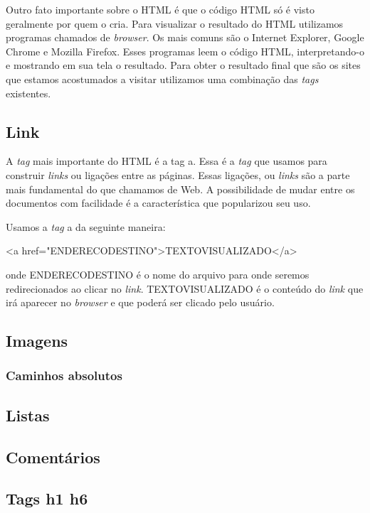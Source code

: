 Outro fato importante sobre o HTML é que o código HTML só é visto geralmente por quem o cria. Para visualizar o resultado do HTML utilizamos programas chamados de \textit{browser}. Os mais comuns são o Internet Explorer, Google Chrome e Mozilla Firefox. Esses programas leem o código HTML, interpretando-o e mostrando em sua tela o resultado. Para obter o resultado final que são os sites que estamos acostumados a visitar utilizamos uma combinação das \textit{tags} existentes.

\subsection{Link}

A \textit{tag} mais importante do HTML é a tag a. Essa é a \textit{tag} que usamos para construir \textit{links} ou ligações entre as páginas. Essas ligações, ou \textit{links} são a parte mais fundamental do que chamamos de Web. A possibilidade de mudar entre os documentos com facilidade é a característica que popularizou seu uso.

Usamos a \textit{tag} a da seguinte maneira:

<a href="ENDERECODESTINO">TEXTOVISUALIZADO</a>

onde ENDERECODESTINO é o nome do arquivo para onde seremos redirecionados ao clicar no \textit{link}. TEXTOVISUALIZADO é o conteúdo do \textit{link} que irá aparecer no \textit{browser} e que poderá ser clicado pelo usuário.

\subsection{Imagens}

\subsubsection{Caminhos absolutos}

\subsection{Listas}

\subsection{Comentários}

\subsection{Tags h1 h6}

